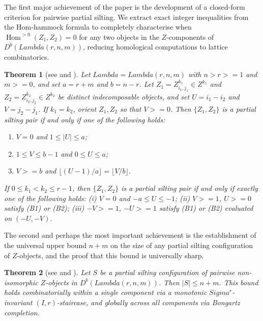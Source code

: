 \documentclass[11pt, a4paper]{article}
\newtheorem{theorem}{Theorem}[section]
\theoremstyle{definition}
\def\Lambda{Lambda}%
\def\Sigma{Sigma}%
\def\ge{>=}%
\def\mathcal#1{#1}%
\def\Db{D^b}%
\newcommand{\Db}{\mathcal{D}^b}
\begin{document}
The first major achievement of the paper is the development of a closed-form criterion for pairwise partial silting. We extract exact integer inequalities from the Hom-hammock formula to completely characterise when $\operatorname{Hom}^{>0}(Z_1, Z_2) = 0$ for any two objects in the $\mathcal Z$-components of $\Db(\Lambda(r,n,m))$, reducing homological computations to lattice combinatorics.

\begin{theorem}[see  and ]\label{thm:intro-criterion}
Let $\Lambda = \Lambda(r,n,m)$ with $n > r \ge 1$ and $m \ge 0$, and set $a = r+m$ and $b = n-r$. Let $Z_1 = Z_{i_1,j_1}^{k_1} \in \mathcal Z^{k_1}$ and $Z_2 = Z_{i_2,j_2}^{k_2} \in \mathcal Z^{k_2}$ be distinct indecomposable objects, and set $U = i_1 - i_2$ and $V = j_2 - j_1$. If $k_1 = k_2$, orient $Z_1, Z_2$ so that $V \ge 0$. Then $\{Z_1, Z_2\}$ is a partial silting pair if and only if one of the following holds:
\begin{enumerate}[label=\textup{(\arabic*)}]
  \item[\textup{(A)}] $V = 0$ and $1 \le |U| \le a$;
  \item[\textup{(B1)}] $1 \le V \le b - 1$ and $0 \le U \le a$;
  \item[\textup{(B2)}] $V \ge b$ and $\lfloor (U-1)/a \rfloor = \lfloor V/b \rfloor$.
\end{enumerate}
If $0 \le k_1 < k_2 \le r-1$, then $\{Z_1, Z_2\}$ is a partial silting pair if and only if exactly one of the following holds: \textup{(i)} $V = 0$ and $-a \le U \le -1$; \textup{(ii)} $V \ge 1$, $U \ge 0$ satisfy \textup{(B1)} or \textup{(B2)}; \textup{(iii)} $-V \ge 1$, $-U \ge 1$ satisfy \textup{(B1)} or \textup{(B2)} evaluated on $(-U, -V)$.
\end{theorem}

The second and perhaps the most important achievement is the establishment of the universal upper bound $n+m$ on the size of any partial silting configuration of $\mathcal Z$-objects, and the proof that this bound is universally sharp.

\begin{theorem}[see  and ]\label{thm:intro-bound}
Let $S$ be a partial silting configuration of pairwise non-isomorphic $\mathcal Z$-objects in $\Db(\Lambda(r,n,m))$. Then $|S| \le n+m$. This bound holds combinatorially within a single component via a monotonic $\Sigma^r$-invariant $(I,r)$-staircase, and globally across all components via Bongartz completion.
\end{theorem}
\end{document}
